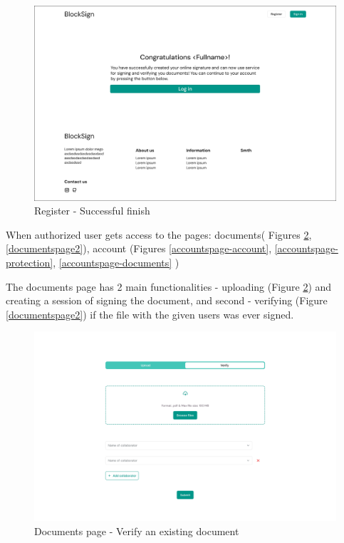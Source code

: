 \begin{figure}[H]
    \centering
    \includegraphics[width=18cm]{"images/figmaUI/successregister.png"}
    \caption{Register - Successful finish}
    \label{successregister}
\end{figure}

\newpage
When authorized user gets access to the pages: documents( Figures \ref{documentspage1}, \ref{documentspage2}), account (Figures \ref{accountspage-account}, \ref{accountspage-protection}, \ref{accountspage-documents} )


The documents page has 2 main functionalities - uploading (Figure \ref{documentspage1}) and creating a session of signing the document, and second - verifying (Figure \ref{documentspage2}) if the file with the given users was ever signed. 


\begin{figure}[H]
    \centering
    \includegraphics[width=18cm]{"images/figmaUI/documentspage1-crop.png"}
    \caption{Documents page - Verify an existing document}
    \label{documentspage1}
\end{figure}


